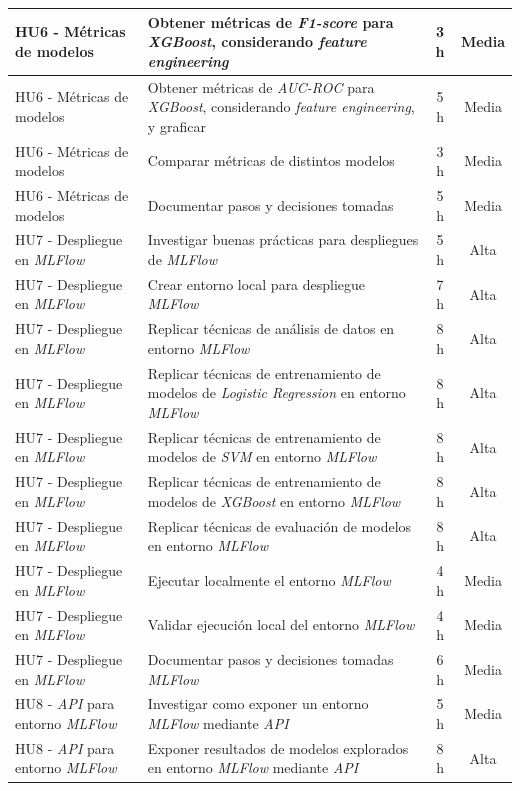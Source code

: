 \documentclass[
11pt, %
]{charter}
\begin{document}
\begin{xltabular}{\linewidth}{@{}|X|X|c|c|@{}}
HU6 - Métricas de modelos & Obtener métricas de \textit{F1-score} para \textit{XGBoost}, considerando \textit{feature engineering} & 3 h & Media \\ \hline
HU6 - Métricas de modelos & Obtener métricas de \textit{AUC-ROC} para \textit{XGBoost}, considerando \textit{feature engineering}, y graficar & 5 h & Media \\ \hline
HU6 - Métricas de modelos & Comparar métricas de distintos modelos & 3 h & Media \\ \hline
HU6 - Métricas de modelos & Documentar pasos y decisiones tomadas & 5 h & Media \\ \hline
HU7 - Despliegue en \textit{MLFlow} & Investigar buenas prácticas para despliegues de \textit{MLFlow} & 5 h & Alta \\ \hline
HU7 - Despliegue en \textit{MLFlow} & Crear entorno local para despliegue \textit{MLFlow} & 7 h & Alta \\ \hline
HU7 - Despliegue en \textit{MLFlow} & Replicar técnicas de análisis de datos en entorno \textit{MLFlow} & 8 h & Alta \\ \hline
HU7 - Despliegue en \textit{MLFlow} & Replicar técnicas de entrenamiento de modelos de \textit{Logistic Regression} en entorno \textit{MLFlow} & 8 h & Alta \\ \hline
HU7 - Despliegue en \textit{MLFlow} & Replicar técnicas de entrenamiento de modelos de \textit{SVM} en entorno \textit{MLFlow} & 8 h & Alta \\ \hline
HU7 - Despliegue en \textit{MLFlow} & Replicar técnicas de entrenamiento de modelos de \textit{XGBoost} en entorno \textit{MLFlow} & 8 h & Alta \\ \hline
HU7 - Despliegue en \textit{MLFlow} & Replicar técnicas de evaluación de modelos en entorno \textit{MLFlow} & 8 h & Alta \\ \hline
HU7 - Despliegue en \textit{MLFlow} & Ejecutar localmente el entorno \textit{MLFlow} & 4 h & Media \\ \hline
HU7 - Despliegue en \textit{MLFlow} & Validar ejecución local del entorno \textit{MLFlow} & 4 h & Media \\ \hline
HU7 - Despliegue en \textit{MLFlow} & Documentar pasos y decisiones tomadas \textit{MLFlow} & 6 h & Media \\ \hline
HU8 - \textit{API} para entorno \textit{MLFlow} & Investigar como exponer un entorno \textit{MLFlow} mediante \textit{API} & 5 h & Media \\ \hline
HU8 - \textit{API} para entorno \textit{MLFlow} & Exponer resultados de modelos explorados en entorno \textit{MLFlow} mediante \textit{API} & 8 h & Alta \\ \hline

\end{xltabular}
\end{document}
